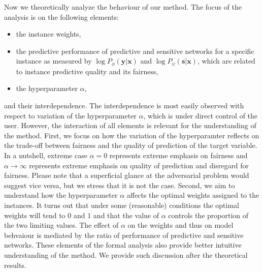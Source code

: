 \documentclass[preprint,12pt]{elsarticle}
\begin{document}
Now we theoretically analyze the behaviour of our method. The focus of the analysis is on the following elements:
\begin{itemize}
	\item the instance weights,
	\item the predictive performance of predictive and sensitive networks for a specific instance as measured by $\log P_{\phi}(\mathbf{y}|\mathbf{x})$ and $\log P_{\psi}(\mathbf{s}|\mathbf{x})$, which are related to instance predictive quality and its fairness,
	\item the hyperparameter $\alpha$, 
\end{itemize}
and their interdependence. The interdependence is most easily observed with respect to variation of the hyperparameter $\alpha$, which is under direct control of the user. However, the interaction of all elements is relevant for the understanding of the method. First, we focus on how the variation of the hyperparamter reflects on the trade-off between fairness and the quality of prediction of the target variable. In a nutshell, extreme case $\alpha=0$ represents extreme emphasis on fairness and $\alpha\rightarrow\infty$ represents extreme emphasis on quality of prediction and disregard for fairness. Please note that a superficial glance at the adversarial problem would suggest vice versa, but we stress that it is not the case. Second, we aim to understand how the hyperparameter $\alpha$ affects the optimal weights assigned to the instances. It turns out that under some (reasonable) conditions the optimal weights will tend to $0$ and $1$ and that the value of $\alpha$ controls the proportion of the two limiting values. The effect of $\alpha$ on the weights and thus on model behvaiour is mediated by the ratio of performance of predictive and sensitive networks. These elements of the formal analysis also provide better intuitive understanding of the method. We provide such discussion after the theoretical results.
\end{document}
